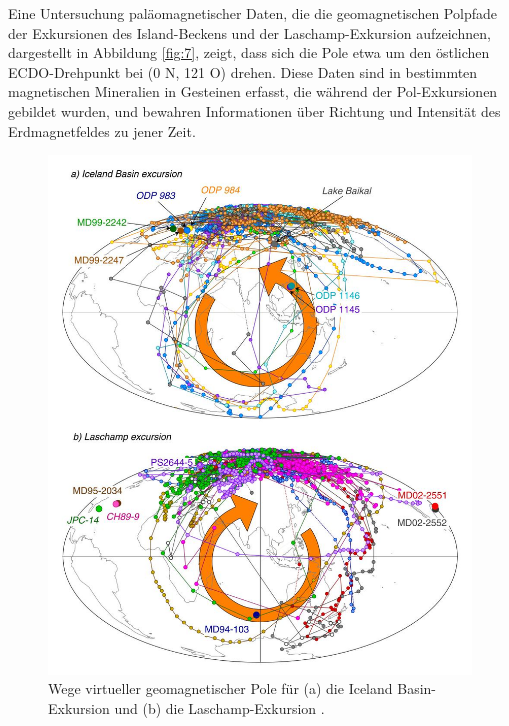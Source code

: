 \documentclass[10pt,twocolumn,letterpaper]{article}
\begin{document}
Eine Untersuchung paläomagnetischer Daten, die die geomagnetischen Polpfade der Exkursionen des Island-Beckens und der Laschamp-Exkursion \cite{35} aufzeichnen, dargestellt in Abbildung \ref{fig:7}, zeigt, dass sich die Pole etwa um den östlichen ECDO-Drehpunkt bei (0 N, 121 O) drehen. Diese Daten sind in bestimmten magnetischen Mineralien in Gesteinen erfasst, die während der Pol-Exkursionen gebildet wurden, und bewahren Informationen über Richtung und Intensität des Erdmagnetfeldes zu jener Zeit.
\begin{figure}[t]
\begin{center}
   \includegraphics[width=0.95\linewidth]{laj.jpg}
\end{center}
   \caption{Wege virtueller geomagnetischer Pole für (a) die Iceland Basin-Exkursion und (b) die Laschamp-Exkursion \cite{35}.}
\label{fig:7}
\label{fig:onecol}
\end{figure}
\end{document}
